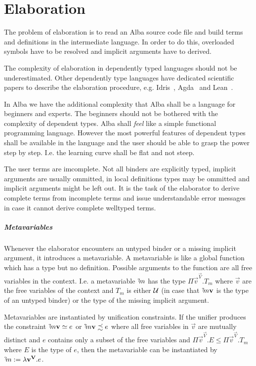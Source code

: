 \chapter{Elaboration}

The problem of elaboration is to read an Alba source code file and build terms
and definitions in the intermediate language. In order to do this, overloaded
symbols have to be resolved and implicit arguments have to derived.

The complexity of elaboration in dependently typed languages should not be
underestimated. Other dependently type languages have dedicated scientific
papers to describe the elaboration procedure, e.g.
Idris~\cite{brady2013}, Agda~\cite{norell2007} and Lean~\cite{demoura2015}.

In Alba we have the additional complexity that Alba shall be a language for
beginners and experts. The beginners should not be bothered with the complexity
of dependent types. Alba shall \emph{feel} like a simple functional programming
language. However the most powerful features of dependent types shall be
available in the language and the user should be able to grasp the power step by
step. I.e. the learning curve shall be flat and not steep.


The user terms are imcomplete. Not all binders are explicitly typed, implicit
arguments are usually ommitted, in local definitions types may be ommitted and
implicit arguments might be left out. It is the task of the elaborator to
derive complete terms from incomplete terms and issue understandable error
messages in case it cannot derive complete welltyped terms.


\paragraph{Metavariables}
Whenever the elaborator encounters an untyped binder or a missing implicit
argument, it introduces a metavariable. A metavariable is like a global function
which has a type but no definition. Possible arguments to the function are all
free variables in the context. I.e. a metavariable $\meta{m}$ has the type $\Pi
\vec{v}^\vec{V}. T_m$ where $\vec{v}$ are the free variables of the context and
$T_m$ is either ${\cal{U}}$ (in case that $\meta{m} \vec{v}$ is the type of an
untyped binder) or the type of the missing implicit argument.

Metavariables are instantiated by unification constraints. If the unifier
produces the constraint $\meta{m} \vec{v} \unify e$ or $\meta{m} \vec{v}
\unifysub e$ where all free variables in $\vec{v}$ are mutually distinct and $e$
contains only a subset of the free variables and $\Pi \vec{v}^\vec{V}. E \le \Pi
\vec{v}^\vec{V}.T_m$ where $E$ is the type of $e$, then the metavariable can be
instantiated by $\meta{m} := \lambda \vec{v}^\vec{V}. e$.

